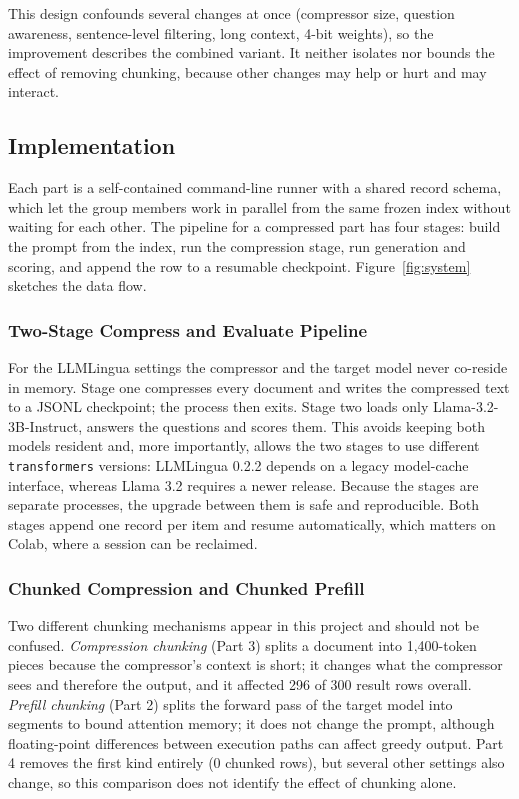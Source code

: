 \documentclass[10pt,a4paper,twocolumn]{article}
\begin{document}
This design confounds several changes at once (compressor size, question
awareness, sentence-level filtering, long context, 4-bit weights), so the
improvement describes the combined variant. It neither isolates nor bounds the effect of removing chunking, because other changes may help or hurt and may interact.

\subsection{Implementation}

Each part is a self-contained command-line runner with a shared record schema,
which let the group members work in parallel from the same frozen index without
waiting for each other. The pipeline for a compressed part has four stages: build
the prompt from the index, run the compression stage, run generation and scoring,
and append the row to a resumable checkpoint. Figure~\ref{fig:system} sketches the
data flow.

\subsubsection{Two-Stage Compress and Evaluate Pipeline}

For the LLMLingua settings the compressor and the target model never co-reside in
memory. Stage one compresses every document and writes the compressed text to a
JSONL checkpoint; the process then exits. Stage two loads only
Llama-3.2-3B-Instruct, answers the questions and scores them. This avoids keeping both models resident and, more importantly, allows the two stages to use different
\texttt{transformers} versions: LLMLingua 0.2.2 depends on a legacy model-cache
interface, whereas Llama 3.2 requires a newer release. Because the stages are
separate processes, the upgrade between them is safe and reproducible. Both stages
append one record per item and resume automatically, which matters on Colab, where
a session can be reclaimed.

\subsubsection{Chunked Compression and Chunked Prefill}

Two different chunking mechanisms appear in this project and should not be
confused. \emph{Compression chunking} (Part 3) splits a document into
1{,}400-token pieces because the compressor's context is short; it changes what the
compressor sees and therefore the output, and it affected 296 of 300 result rows
overall. \emph{Prefill chunking} (Part 2) splits the forward pass of the target
model into segments to bound attention memory; it does not change the prompt, although floating-point differences between execution paths can affect greedy output. Part 4 removes the
first kind entirely (0 chunked rows), but several other settings also change, so this comparison does not identify the effect of chunking alone.
\end{document}
